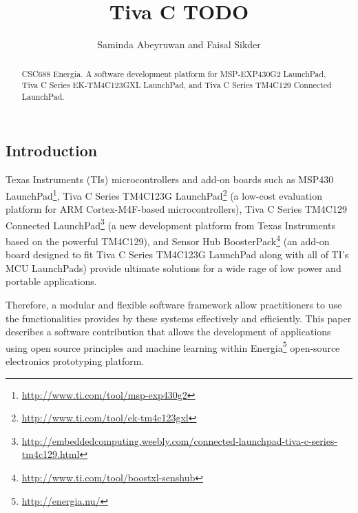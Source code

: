 \documentclass{llncs}
\begin{document}
\begin{sloppy}
\title{Tiva C TODO}
\author{Saminda Abeyruwan and Faisal Sikder}

\maketitle

\begin{abstract}
CSC688 Energia. A software development platform for MSP-EXP430G2 LaunchPad, Tiva C Series
EK-TM4C123GXL LaunchPad, and Tiva C Series TM4C129 Connected LaunchPad.
\end{abstract}


\section{Introduction}

Texas Instruments (TIs) microcontrollers and add-on boards such as MSP430{\small \texttrademark}
LaunchPad\footnote{\url{http://www.ti.com/tool/msp-exp430g2}},
Tiva{\small \texttrademark} C Series TM4C123G
LaunchPad\footnote{\url{http://www.ti.com/tool/ek-tm4c123gxl}} (a low-cost evaluation platform for
ARM
Cortex-M4F-based microcontrollers), Tiva C Series TM4C129 Connected
LaunchPad\footnote{\url{
http://embeddedcomputing.weebly.com/connected-launchpad-tiva-c-series-tm4c129.html}} (a new
development platform from Texas Instruments
based on the powerful TM4C129), and Sensor
Hub BoosterPack\footnote{\url{http://www.ti.com/tool/boostxl-senshub}} (an add-on board designed to
fit Tiva C Series TM4C123G LaunchPad
along with all of TI’s MCU LaunchPads) provide ultimate solutions
for a wide rage of low power and portable applications.

Therefore, a modular and flexible software
framework allow practitioners to use the functionalities provides by these systems effectively
and efficiently. This paper describes a software contribution that allows the development of
applications using open source principles and machine learning within
Energia\footnote{\url{http://energia.nu/}} open-source electronics prototyping platform.


\end{sloppy}
\end{document}
